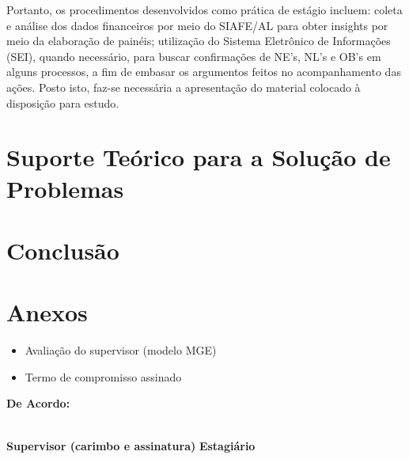 \documentclass[12pt,a4paper]{article}
\begin{document}
	Portanto, os procedimentos desenvolvidos como prática de estágio incluem: coleta e análise dos dados financeiros por meio do SIAFE/AL 
	para obter insights por meio da elaboração de painéis; utilização do Sistema Eletrônico de Informações (SEI), quando necessário, 
 	para buscar confirmações de NE’s, NL’s e OB’s em alguns processos, a fim de embasar os argumentos feitos no acompanhamento das ações.
 	Posto isto, faz-se necessária a apresentação do material colocado à disposição para estudo.


	\section{Suporte Teórico para a Solução de Problemas}
	\hspace*{1,5cm}
	
	\section{Conclusão}
	
	
	\section{Anexos}
	
	\begin{itemize}
		\item Avaliação do supervisor (modelo MGE)
		\item Termo de compromisso assinado
	\end{itemize}
	
	\vspace{2cm}
	\noindent \textbf{De Acordo:}
	
	\vspace{2cm}
	\noindent \underline{\hspace{7cm}} \hfill \underline{\hspace{7cm}} \\
	\textbf{Supervisor (carimbo e assinatura)} \hfill \textbf{Estagiário}
	
\end{document}
